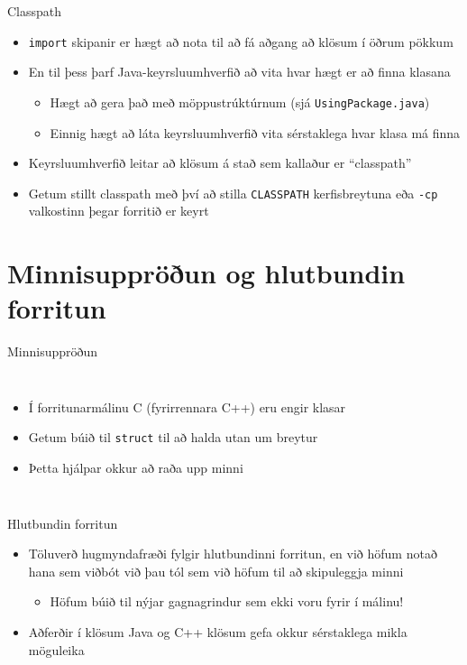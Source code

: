 \documentclass{beamer}
\begin{document}
\begin{frame}[fragile]{Classpath}
	\begin{itemize}
		\item \texttt{import} skipanir er hægt að nota til að fá aðgang að klösum í öðrum pökkum
		\item En til þess þarf Java-keyrsluumhverfið að vita hvar hægt er að finna klasana
		      \begin{itemize}
			      \item Hægt að gera það með möppustrúktúrnum (sjá \texttt{UsingPackage.java})
			      \item Einnig hægt að láta keyrsluumhverfið vita sérstaklega hvar klasa má finna
		      \end{itemize}
		\item Keyrsluumhverfið leitar að klösum á stað sem kallaður er ``classpath''
		\item Getum stillt classpath með því að stilla \texttt{CLASSPATH} kerfisbreytuna eða \texttt{-cp} valkostinn þegar forritið er keyrt
	\end{itemize}
\end{frame}

\section{Minnisuppröðun og hlutbundin forritun}

\begin{frame}[fragile]{Minnisuppröðun}
	\begin{columns}
		\begin{itemize}
			\item Í forritunarmálinu C (fyrirrennara C++) eru engir klasar
			\item Getum búið til \texttt{struct} til að halda utan um breytur
			\item Þetta hjálpar okkur að raða upp minni
		\end{itemize}
	\end{columns}
\end{frame}

\begin{frame}{Hlutbundin forritun}
	\begin{itemize}
		\item Töluverð hugmyndafræði fylgir hlutbundinni forritun, en við höfum notað hana sem viðbót við þau tól sem við höfum til að skipuleggja minni
		      \begin{itemize}
			      \item Höfum búið til nýjar gagnagrindur sem ekki voru fyrir í málinu!
		      \end{itemize}
		\item Aðferðir  í klösum Java og C++ klösum gefa okkur sérstaklega mikla möguleika
	\end{itemize}
\end{frame}
\end{document}

